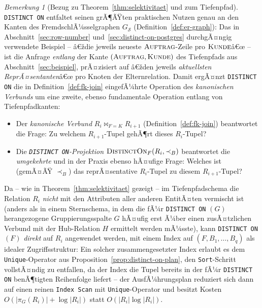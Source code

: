﻿\documentclass[a4paper,12pt]{report}
\theoremstyle{definition}
\theoremstyle{remark}
\newtheorem{remark}{Bemerkung}[chapter]
\begin{document}
\begin{remark}[Bezug zu Theorem~\ref{thm:selektivitaet} und
zum Tiefenpfad]
\label{rem:distinct-on-tiefenpfad}
\texttt{DISTINCT ON} entfaltet seinen grÃ¶ÃŸten praktischen Nutzen genau
an den Kanten des FremdschlÃ¼sselgraphen $G_{\mathcal{S}}$
(Definition~\ref{def:er-graph}): Das in
Abschnitt~\ref{sec:row-number} und~\ref{sec:distinct-on-postgres}
durchgÃ¤ngig verwendete Beispiel -- â€ždie jeweils neueste
$\textsc{Auftrag}$-Zeile pro $\textsc{Kunde}$â€œ -- ist die Anfrage
\emph{entlang} der Kante $(\textsc{Auftrag},\textsc{Kunde})$ des
Tiefenpfads aus Abschnitt~\ref{sec:beispiel}, prÃ¤zisiert auf
â€žden jeweils \emph{aktuellsten ReprÃ¤sentanten}â€œ pro Knoten der
Elternrelation. Damit ergÃ¤nzt \texttt{DISTINCT ON} die in
Definition~\ref{def:fk-join} eingefÃ¼hrte Operation des
\emph{kanonischen Verbunds} um eine zweite, ebenso fundamentale
Operation entlang von Tiefenpfadkanten:

\begin{itemize}
  \item Der \emph{kanonische Verbund} $R_i\Join_{F=K}R_{i+1}$
    (Definition~\ref{def:fk-join}) beantwortet die Frage:
    \glqq Zu welchem $R_{i+1}$-Tupel gehÃ¶rt dieses
    $R_i$-Tupel?\grqq{}
  \item Die \emph{\texttt{DISTINCT ON}-Projektion}
    $\textsc{DistinctOn}_{F}(R_i,\prec_B)$ beantwortet die
    \emph{umgekehrte} und in der Praxis ebenso hÃ¤ufige Frage:
    \glqq Welches ist (gemÃ¤ÃŸ $\prec_B$) das reprÃ¤sentative
    $R_i$-Tupel zu diesem $R_{i+1}$-Tupel?\grqq{}
\end{itemize}

Da -- wie in Theorem~\ref{thm:selektivitaet} gezeigt -- im
Tiefenpfadschema die Relation $R_i$ \emph{nicht} mit den Attributen
aller anderen EntitÃ¤ten vermischt ist (anders als in einem
Sternschema, in dem die fÃ¼r \texttt{DISTINCT ON} $(G)$
herangezogene Gruppierungsspalte $G$ hÃ¤ufig erst Ã¼ber einen
zusÃ¤tzlichen Verbund mit der Hub-Relation $H$ ermittelt werden mÃ¼sste),
kann \texttt{DISTINCT ON} $(F)$ \emph{direkt} auf $R_i$ angewendet
werden, mit einem Index auf $(F,B_1,\ldots,B_q)$ als idealer
Zugriffsstruktur: Ein solcher zusammengesetzter Index erlaubt es dem
\texttt{Unique}-Operator aus
Proposition~\ref{prop:distinct-on-plan}, den
\texttt{Sort}-Schritt vollstÃ¤ndig zu entfallen, da der Index die
Tupel bereits in der fÃ¼r \texttt{DISTINCT ON} benÃ¶tigten Reihenfolge
liefert -- der AusfÃ¼hrungsplan reduziert sich dann auf einen reinen
\texttt{Index Scan} mit \texttt{Unique}-Operator und besitzt Kosten
$O(|\pi_G(R_i)|+\log|R_i|)$ statt $O(|R_i|\log|R_i|)$.
\end{remark}
\end{document}
